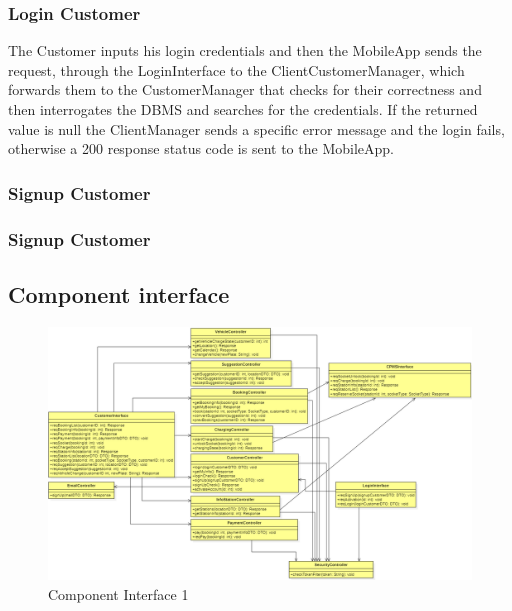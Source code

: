 \subsubsection{Login Customer}
The Customer inputs his login credentials and then the MobileApp sends the request, through the LoginInterface to the ClientCustomerManager, which forwards them to the CustomerManager that checks for their correctness and then interrogates the DBMS and searches for the credentials. If the returned value is null the ClientManager sends a specific error message and the login fails, otherwise a 200 response status code is sent to the MobileApp.
\subsubsection{Signup Customer}
\subsubsection{Signup Customer}

\subsection{Component interface}


\begin{figure}[H]
    \begin{center}
        \includegraphics[width=\textwidth]{img/ComponentInterface1.PNG}
        \caption{Component Interface 1}\label{component_interface1}
    \end{center}
\end{figure}

